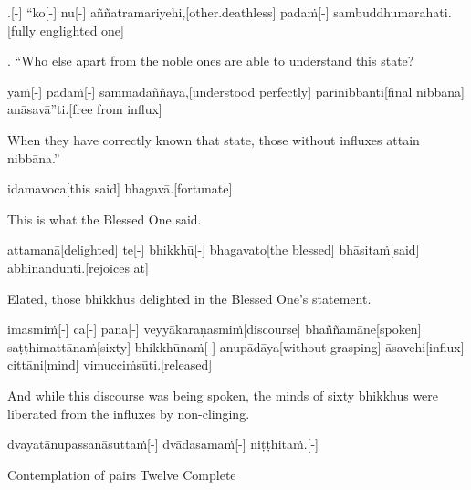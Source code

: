\begin{samepage}
.[-] “ko[-] nu[-] aññatramariyehi,[other.deathless] padaṁ[-] sambuddhumarahati.[fully englighted one]
\endgl
\nopagebreak
\linespread{0.5}
\begin{spacin}{0.2}
{. “Who else apart from the noble ones are able to understand this state?}
\end{spacin}
\vskip 12pt
\end{samepage}
\begin{samepage}
\begingl[glneveryline={\PaliGlossA,\PaliGlossB}]
yaṁ[-] padaṁ[-] sammadaññāya,[understood perfectly] parinibbanti[final nibbana] anāsavā”ti.[free from influx]
\endgl
\nopagebreak
\linespread{0.5}
\begin{spacin}{0.2}
{\PaliGlossFT When they have correctly known that state, those without influxes attain nibbāna.”}
\end{spacin}
\vskip 12pt
\end{samepage}
\vskip 0.2in
\begin{samepage}
\begingl[glneveryline={\PaliGlossA,\PaliGlossB}]
idamavoca[this said] bhagavā.[fortunate]
\endgl
\nopagebreak
\linespread{0.5}
\begin{spacin}{0.2}
{\PaliGlossFT This is what the Blessed One said.}
\end{spacin}
\vskip 12pt
\end{samepage}
\begin{samepage}
\begingl[glneveryline={\PaliGlossA,\PaliGlossB}]
attamanā[delighted] te[-] bhikkhū[-] bhagavato[the blessed] bhāsitaṁ[said] abhinandunti.[rejoices at]
\endgl
\nopagebreak
\linespread{0.5}
\begin{spacin}{0.2}
{\PaliGlossFT Elated, those bhikkhus delighted in the Blessed One’s statement.}
\end{spacin}
\vskip 12pt
\end{samepage}
\begin{samepage}
\begingl[glneveryline={\PaliGlossA,\PaliGlossB}]
imasmiṁ[-] ca[-] pana[-] veyyākaraṇasmiṁ[discourse] bhaññamāne[spoken] saṭṭhimattānaṁ[sixty] bhikkhūnaṁ[-] anupādāya[without grasping] āsavehi[influx] cittāni[mind] vimucciṁsūti.[released]
\endgl
\nopagebreak
\linespread{0.5}
\begin{spacin}{0.2}
{\PaliGlossFT And while this discourse was being spoken, the minds of sixty bhikkhus were liberated from the influxes by non-clinging.}
\end{spacin}
\vskip 12pt
\end{samepage}
\vskip 0.2in
\begin{samepage}
\begingl[glneveryline={\PaliGlossA,\PaliGlossB}]
dvayatānupassanāsuttaṁ[-] dvādasamaṁ[-] niṭṭhitaṁ.[-]
\endgl
\nopagebreak
\linespread{0.5}
\begin{spacin}{0.2}
{\PaliGlossFT Contemplation of pairs Twelve Complete}
\end{spacin}
\vskip 12pt
\end{samepage}